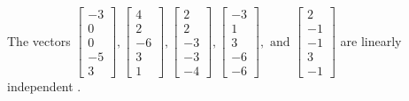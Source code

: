 \begin{exercise}
\begin{exerciseStatement}
  \end{exerciseStatement}
  \begin{exerciseAnswer}
   The vectors \(\left[\begin{array}{r}
-3 \\
0 \\
0 \\
-5 \\
3
\end{array}\right] , \left[\begin{array}{r}
4 \\
2 \\
-6 \\
3 \\
1
\end{array}\right] , \left[\begin{array}{r}
2 \\
2 \\
-3 \\
-3 \\
-4
\end{array}\right] , \left[\begin{array}{r}
-3 \\
1 \\
3 \\
-6 \\
-6
\end{array}\right] , \text{ and } \left[\begin{array}{r}
2 \\
-1 \\
-1 \\
3 \\
-1
\end{array}\right]\) are 
  	 linearly independent  .
  


  \end{exerciseAnswer}
\end{exercise}